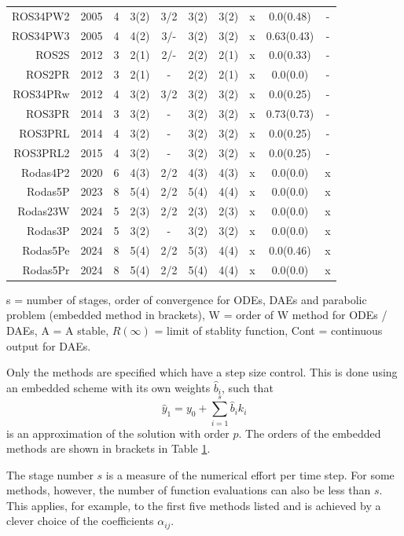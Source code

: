 \documentclass{juliacon}
\begin{document}
\begin{table}[t]
{\begin{tabular}{r|ccccccccc}
ROS34PW2 &\cite{ranga} 2005&4&3(2)&3/2&3(2)&3(2)&x&0.0(0.48)&- \\ %
ROS34PW3 &\cite{ranga} 2005&4&4(2)&3/-&3(2)&3(2)&x&0.63(0.43)&- \\
ROS2S &\cite{rang12} 2012&3&2(1)&2/-&2(2)&2(1)&x&0.0(0.33)&- \\
ROS2PR &\cite{rang12a} 2012&3&2(1)&-&2(2)&2(1)&x&0.0(0.0)&- \\
ROS34PRw &\cite{rang12a} 2012&4&3(2)&3/2&3(2)&3(2)&x&0.0(0.25)&- \\ %
ROS3PR &\cite{rang1} 2014 &3& 3(2)&-&3(2)&3(2)&x&0.73(0.73)& -\\
ROS3PRL &\cite{rang1} 2014&4&3(2)&-&3(2)&3(2)&x&0.0(0.25)&- \\
ROS3PRL2 &\cite{rang15} 2015&4&3(2)&-&3(2)&3(2)&x&0.0(0.25)&- \\
Rodas4P2 &\cite{rodas4p2} 2020&6&4(3)&2/2&4(3)&4(3)&x&0.0(0.0)&x \\ %
Rodas5P &\cite{rodas5p} 2023&8&5(4)&2/2&5(4)&4(4)& x&0.0(0.0)&x \\ %
\hline
Rodas23W &2024&5&2(3)&2/2&2(3)&2(3)&x&0.0(0.0)& x\\
Rodas3P  &2024&5&3(2)& - &3(2)&3(2)&x&0.0(0.0)& x\\
Rodas5Pe &2024&8&5(4)&2/2&5(3)&4(4)& x&0.0(0.46)&x \\ %
Rodas5Pr &2024&8&5(4)&2/2&5(4)&4(4)& x&0.0(0.0)&x \\ %
\hline 
\end{tabular}}
\label{tab:overview}
\begin{tabnote}
s = number of stages, order of convergence for ODEs, DAEs and parabolic problem (embedded
method in brackets), W = order of W method for ODEs / DAEs, A = A stable, $R(\infty)$ = limit of stablity function, Cont = continuous output for DAEs.\end{tabnote}
\end{table}

Only the methods are specified which have a step size control. This is done using an embedded scheme with its own weights $\hat b_i$, such that 
\[ \hat y_1 = y_0 + \sum_{i=1}^{s} \hat b_i k_i\]
is an approximation of the solution with order $\hat p$.
The orders of the embedded methods are shown in brackets in Table \ref{tab:overview}.

The stage number $s$ is a measure of the numerical effort per time step. For some methods, however, the number of function evaluations can also be less than $s$. 
This applies, for example, to the first five methods listed and is achieved by a clever choice of the coefficients $\alpha_{ij}$.
\end{document}
